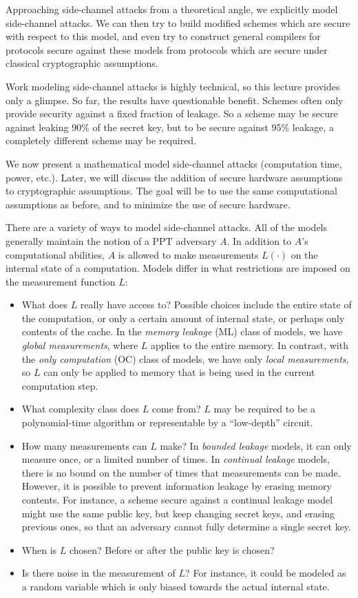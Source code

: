 \documentclass[10pt]{article}
\begin{document}
Approaching side-channel attacks from a theoretical angle, we explicitly model side-channel attacks. We can then try to build modified schemes which are secure with respect to this model, and even try to construct general compilers for protocols secure against these models from protocols which are secure under classical cryptographic assumptions.

Work modeling side-channel attacks is highly technical, so this lecture provides only a glimpse. So far, the results have questionable benefit. Schemes often only provide security against a fixed fraction of leakage. So a scheme may be secure against leaking 90\% of the secret key, but to be secure against 95\% leakage, a completely different scheme may be required.

We now present a mathematical model side-channel attacks (computation time, power, etc.). Later, we will discuss the addition of secure hardware assumptions to cryptographic assumptions. The goal will be to use the same computational assumptions as before, and to minimize the use of secure hardware.

There are a variety of ways to model side-channel attacks. All of the models generally maintain the notion of a PPT adversary $A$. In addition to $A$'s computational abilities, $A$ is allowed to make measurements $L(\cdot)$ on the internal state of a computation. Models differ in what restrictions are imposed on the measurement function $L$:

\begin{itemize}
\item What does $L$ really have access to? Possible choices include the entire state of the computation, or only a certain amount of internal state, or perhaps only contents of the cache. In the \emph{memory leakage} (ML) class of models, we have \emph{global measurements}, where $L$ applies to the entire memory. In contrast, with the \emph{only computation} (OC) class of models, we have only \emph{local measurements}, so $L$ can only be applied to memory that is being used in the current computation step.
\item What complexity class does $L$ come from? $L$ may be required to be a polynomial-time algorithm or representable by a ``low-depth'' circuit.
\item How many measurements can $L$ make? In \emph{bounded leakage} models, it can only measure once, or a limited number of times. In \emph{continual leakage} models, there is no bound on the number of times that measurements can be made. However, it is possible to prevent information leakage by erasing memory contents. For instance, a scheme secure against a continual leakage model might use the same public key, but keep changing secret keys, and erasing previous ones, so that an adversary cannot fully determine a single secret key.
\item When is $L$ chosen? Before or after the public key is chosen?
\item Is there noise in the measurement of $L$? For instance, it could be modeled as a random variable which is only biased towards the actual internal state.
\end{itemize}
\end{document}
